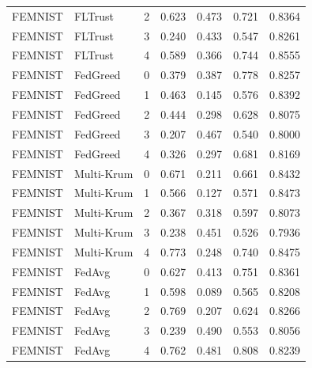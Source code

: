 \begin{tabular}{llrrrrr}
FEMNIST & FLTrust & 2 & 0.623 & 0.473 & 0.721 & 0.8364 \\
FEMNIST & FLTrust & 3 & 0.240 & 0.433 & 0.547 & 0.8261 \\
FEMNIST & FLTrust & 4 & 0.589 & 0.366 & 0.744 & 0.8555 \\
FEMNIST & FedGreed & 0 & 0.379 & 0.387 & 0.778 & 0.8257 \\
FEMNIST & FedGreed & 1 & 0.463 & 0.145 & 0.576 & 0.8392 \\
FEMNIST & FedGreed & 2 & 0.444 & 0.298 & 0.628 & 0.8075 \\
FEMNIST & FedGreed & 3 & 0.207 & 0.467 & 0.540 & 0.8000 \\
FEMNIST & FedGreed & 4 & 0.326 & 0.297 & 0.681 & 0.8169 \\
FEMNIST & Multi-Krum & 0 & 0.671 & 0.211 & 0.661 & 0.8432 \\
FEMNIST & Multi-Krum & 1 & 0.566 & 0.127 & 0.571 & 0.8473 \\
FEMNIST & Multi-Krum & 2 & 0.367 & 0.318 & 0.597 & 0.8073 \\
FEMNIST & Multi-Krum & 3 & 0.238 & 0.451 & 0.526 & 0.7936 \\
FEMNIST & Multi-Krum & 4 & 0.773 & 0.248 & 0.740 & 0.8475 \\
FEMNIST & FedAvg & 0 & 0.627 & 0.413 & 0.751 & 0.8361 \\
FEMNIST & FedAvg & 1 & 0.598 & 0.089 & 0.565 & 0.8208 \\
FEMNIST & FedAvg & 2 & 0.769 & 0.207 & 0.624 & 0.8266 \\
FEMNIST & FedAvg & 3 & 0.239 & 0.490 & 0.553 & 0.8056 \\
FEMNIST & FedAvg & 4 & 0.762 & 0.481 & 0.808 & 0.8239 \\
\bottomrule
\end{tabular}
